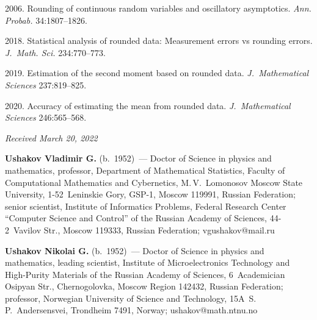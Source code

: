 \begin{multicols}{2}
{{\begin{thebibliography}{99}
 2006. Rounding of continuous random variables and oscillatory asymptotics. \textit{Ann. Probab.} 34:1807--1826.

 2018. Statistical analysis of rounded data: Measurement errors vs rounding errors. \textit{J.~Math. Sci.} 234:770--773.

 2019. Estimation of the second moment based on rounded data. \textit{J.~Mathematical Sciences} 237:819--825.

 2020. Accuracy of estimating the mean from rounded data. \textit{J.~Mathematical Sciences} 246:565--568.

\end{thebibliography}

 }
 }

\end{multicols}

\vspace*{-6pt}

\hfill{\small\textit{Received March 20, 2022}}




\Contr

\noindent
\textbf{Ushakov Vladimir G.} (b.\ 1952)~--- 
Doctor of Science in physics and mathematics, professor, Department of Mathematical Statistics, Faculty of Computational Mathematics and Cybernetics, 
M.\,V.~Lomonosov Moscow State University, 1-52~Leninskie Gory, GSP-1, Moscow 119991, Russian Federation; 
senior scientist, Institute of Informatics Problems, Federal Research Center ``Computer Science and Control'' of the Russian Academy of Sciences, 
44-2~Vavilov Str., Moscow 119333, Russian Federation; \mbox{vgushakov@mail.ru}

\vspace*{3pt}

\noindent
\textbf{Ushakov Nikolai G.} (b.\ 1952)~--- 
Doctor of Science in physics and mathematics, leading scientist, Institute of Microelectronics Technology 
and High-Purity Materials of the Russian Academy of Sciences, 6~Academician Osipyan Str., Chernogolovka, Moscow Region 142432, 
Russian Federation; professor, Norwegian University of Science and Technology, 15A~S.\,P.~Andersensvei, Trondheim 7491, Norway; 
\mbox{ushakov@math.ntnu.no}

\label{end\stat}

\renewcommand{\bibname}{\protect\rm Литература}    